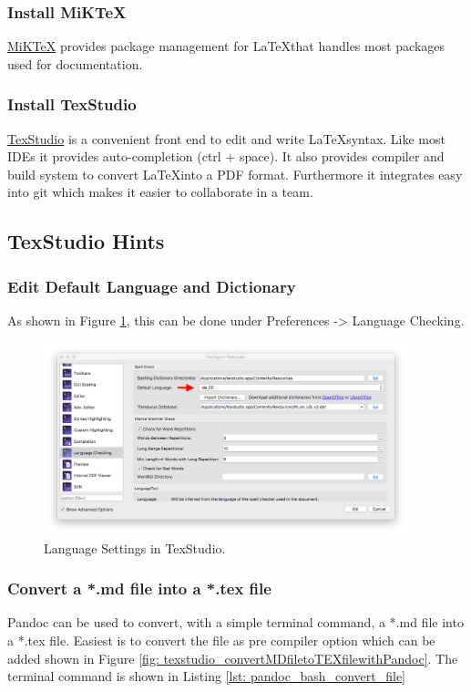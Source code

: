 \subsubsection{Install MiKTeX}\label{subsubsec: install_miktex}
\href{https://miktex.org/}{MiKTeX} provides package management for \LaTeX that handles most packages used for documentation.  

\subsubsection{Install TexStudio}\label{subsubsec: install_texstudio}
\href{https://www.texstudio.org/}{TexStudio} is a convenient front end to edit and write \LaTeX syntax. Like most IDEs it provides auto-completion (ctrl + space). It also provides compiler and build system to convert \LaTeX into a PDF format. Furthermore it integrates easy into git which makes it easier to collaborate in a team.

\subsection{TexStudio Hints}\label{subsec: texstudio_hints}
\subsubsection{Edit Default Language and Dictionary}
As shown in Figure \ref{fig: texstudio_selectDefaultLanguage}, this can be done under Preferences -> Language Checking.
\begin{figure}[ht]
	\centering
	\includegraphics[width=400px ]{02_images/texstudio_selectDefaultLanguage}
	\caption{Language Settings in TexStudio.}
	\label{fig: texstudio_selectDefaultLanguage}
\end{figure}

\subsubsection{Convert a *.md file into a *.tex file}
Pandoc can be used to convert, with a simple terminal command, a *.md file into a *.tex file. Easiest is to convert the file as pre compiler option which can be added shown in Figure \ref{fig: texstudio_convertMDfiletoTEXfilewithPandoc}. The terminal command is shown in Listing \ref{lst: pandoc_bash_convert_file}

